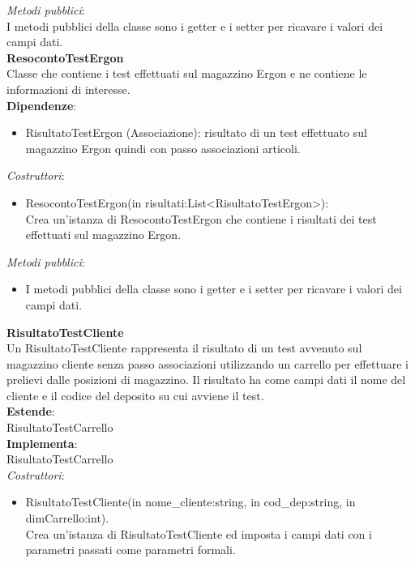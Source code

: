 \textit{Metodi pubblici}:\\
I metodi pubblici della classe sono i getter e i setter per ricavare i valori dei campi dati.\\
\textbf{ResocontoTestErgon}\\
Classe che contiene i test effettuati sul magazzino Ergon e ne contiene le informazioni di interesse.\\
\textbf{Dipendenze}:
\begin{itemize}
    \item RisultatoTestErgon (Associazione): risultato di un test effettuato sul magazzino Ergon quindi con passo associazioni articoli.\\
\end{itemize}
\textit{Costruttori}:\\
\begin{itemize}
    \item ResocontoTestErgon(in risultati:List<RisultatoTestErgon>):\\
    Crea un'istanza di ResocontoTestErgon che contiene i risultati dei test effettuati sul magazzino Ergon.
\end{itemize}
\textit{Metodi pubblici}:\\
\begin{itemize}
    \item I metodi pubblici della classe sono i getter e i setter per ricavare i valori dei campi dati.\\
\end{itemize} 
\textbf{RisultatoTestCliente}\\
Un RisultatoTestCliente rappresenta il risultato di un test avvenuto sul magazzino cliente senza passo associazioni utilizzando un carrello  per effettuare i prelievi 
dalle posizioni di magazzino.
Il risultato ha come campi dati il nome del cliente e il codice del deposito su cui avviene il test.\\
\textbf{Estende}:\\
RisultatoTestCarrello\\
\textbf{Implementa}:\\
RisultatoTestCarrello\\
\textit{Costruttori}:\\
\begin{itemize}
    \item RisultatoTestCliente(in nome\_cliente:string, in cod\_dep:string, in dimCarrello:int).\\
    Crea un'istanza di RisultatoTestCliente ed imposta i campi dati con i parametri passati come parametri formali.\\
\end{itemize}
